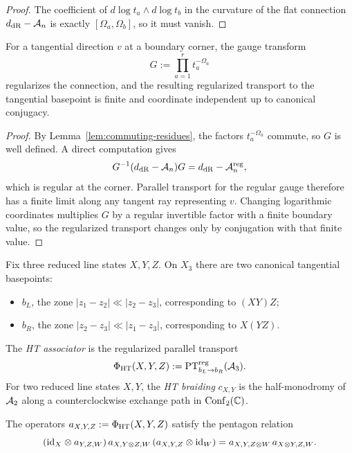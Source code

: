 \begin{proof}
The coefficient of $d\log t_a\wedge d\log t_b$ in the curvature of the flat connection $d_{\mathrm{dR}}-\mathcal A_n$ is exactly $[\Omega_a,\Omega_b]$, so it must vanish.
\end{proof}

\begin{lemma}\label{lem:tangential-regularization}
For a tangential direction $v$ at a boundary corner, the gauge transform
\[
 G := \prod_{a=1}^r t_a^{-\Omega_a}
\]
regularizes the connection, and the resulting regularized transport to the tangential basepoint is finite and coordinate independent up to canonical conjugacy.
\end{lemma}

\begin{proof}
By Lemma~\ref{lem:commuting-residues}, the factors $t_a^{-\Omega_a}$ commute, so $G$ is well defined. A direct computation gives
\[
 G^{-1}(d_{\mathrm{dR}}-\mathcal A_n)G = d_{\mathrm{dR}}-\mathcal A_n^{\mathrm{reg}},
\]
which is regular at the corner. Parallel transport for the regular gauge therefore has a finite limit along any tangent ray representing $v$. Changing logarithmic coordinates multiplies $G$ by a regular invertible factor with a finite boundary value, so the regularized transport changes only by conjugation with that finite value.
\end{proof}

Fix three reduced line states $X,Y,Z$. On $X_3$ there are two canonical tangential basepoints:
\begin{itemize}
 \item $b_L$, the zone $|z_1-z_2|\ll |z_2-z_3|$, corresponding to $(XY)Z$;
 \item $b_R$, the zone $|z_2-z_3|\ll |z_1-z_3|$, corresponding to $X(YZ)$.
\end{itemize}

\begin{definition}\label{def:ht-assoc}
The \emph{HT associator} is the regularized parallel transport
\[
 \Phi_{\mathrm{HT}}(X,Y,Z):=\mathrm{PT}^{\mathrm{reg}}_{b_L\to b_R}(\mathcal A_3).
\]
For two reduced line states $X,Y$, the \emph{HT braiding} $c_{X,Y}$ is the half-monodromy of $\mathcal A_2$ along a counterclockwise exchange path in $\mathrm{Conf}_2(\mathbb C)$.
\end{definition}

\begin{theorem}\label{thm:pentagon}
The operators $a_{X,Y,Z}:=\Phi_{\mathrm{HT}}(X,Y,Z)$ satisfy the pentagon relation
\[
 (\mathrm{id}_X\otimes a_{Y,Z,W})\,a_{X,Y\otimes Z,W}\,(a_{X,Y,Z}\otimes \mathrm{id}_W)
 =
 a_{X,Y,Z\otimes W}\,a_{X\otimes Y,Z,W}.
\]
\end{theorem}

